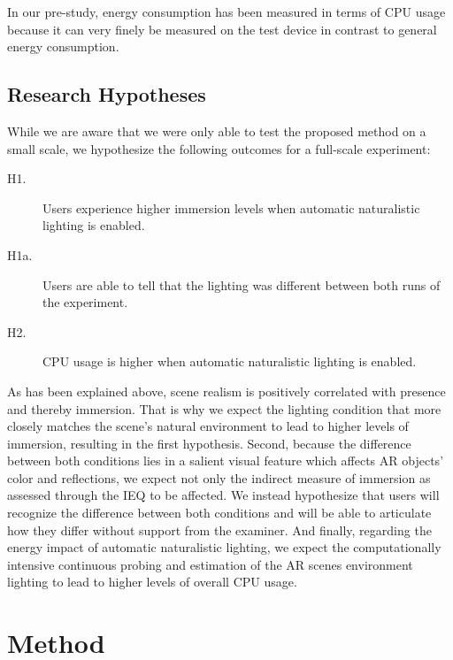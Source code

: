 \documentclass[12pt,twoside,english]{article}
\begin{document}
In our pre-study, energy consumption has been measured in terms of \gls{CPU} usage because it can very finely be measured on the test device in contrast to general energy consumption.

\subsection{Research Hypotheses}

While we are aware that we were only able to test the proposed method on a small scale, we hypothesize the following outcomes for a full-scale experiment:

\begin{description}
    \item[H1.] Users experience higher immersion levels when automatic naturalistic lighting is enabled.
    \item[H1a.] Users are able to tell that the lighting was different between both runs of the experiment.
    \item[H2.] \gls{CPU} usage is higher when automatic naturalistic lighting is enabled.
\end{description}

As has been explained above, scene realism is positively correlated with presence and thereby immersion.
That is why we expect the lighting condition that more closely matches the scene's natural environment to lead to higher levels of immersion, resulting in the first hypothesis.
Second, because the difference between both conditions lies in a salient visual feature which affects \gls{AR} objects' color and reflections, we expect not only the indirect measure of immersion as assessed through the \gls{IEQ} to be affected.
We instead hypothesize that users will recognize the difference between both conditions and will be able to articulate how they differ without support from the examiner.
And finally, regarding the energy impact of automatic naturalistic lighting, we expect the computationally intensive continuous probing and estimation of the \gls{AR} scenes environment lighting to lead to higher levels of overall \gls{CPU} usage.


\section{Method}
\label{sect:method}
\end{document}
